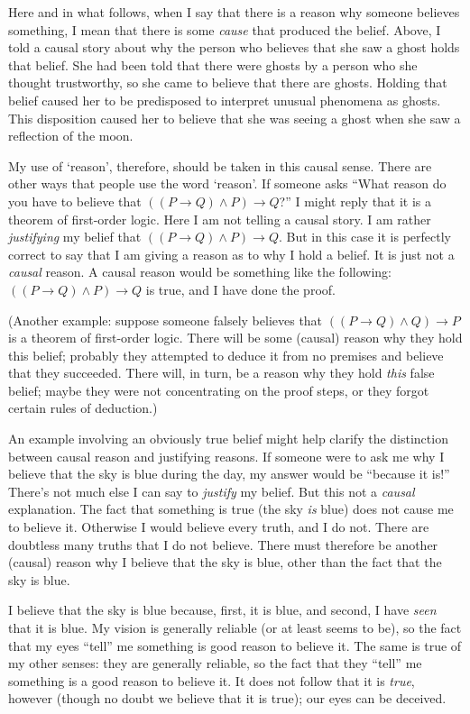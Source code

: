\documentclass[11pt]{article}
\begin{document}
\begin{spacing}{1.5}
Here and in what follows, when I say that there is a reason why
someone believes something, I mean that there is some {\em cause} that
produced the belief.  Above, I told a causal story about why the
person who believes that she saw a ghost holds that belief.  She had
been told that there were ghosts by a person who she thought
trustworthy, so she came to believe that there are ghosts.  Holding
that belief caused her to be predisposed to interpret unusual
phenomena as ghosts.  This disposition caused her to believe that she
was seeing a ghost when she saw a reflection of the moon.

My use of `reason', therefore, should be taken in this causal sense.
There are other ways that people use the word `reason'.  If someone
asks ``What reason do you have to believe that $((P \rightarrow Q )
\wedge P) \rightarrow Q$?''  I might reply that it is a theorem of
first-order logic.  Here I am not telling a causal story.  I am rather
{\em justifying} my belief that $((P \rightarrow Q ) \wedge P)
\rightarrow Q$.  But in this case it is perfectly correct to say that
I am giving a reason as to why I hold a belief.  It is just not a {\em
  causal} reason.  A causal reason would be something like the
following: $((P \rightarrow Q ) \wedge P) \rightarrow Q$ is true, and
I have done the proof.

(Another example: suppose someone falsely believes that $((P
\rightarrow Q ) \wedge Q) \rightarrow P$ is a theorem of first-order
logic.  There will be some (causal) reason why they hold this belief;
probably they attempted to deduce it from no premises and believe that
they succeeded.  There will, in turn, be a reason why they hold {\em
  this} false belief; maybe they were not concentrating on the proof
steps, or they forgot certain rules of deduction.)

An example involving an obviously true belief might help clarify the
distinction between causal reason and justifying reasons.  If someone
were to ask me why I believe that the sky is blue during the day, my
answer would be ``because it is!''  There's not much else I can say to
{\em justify} my belief.  But this not a {\em causal} explanation.
The fact that something is true (the sky {\em is} blue) does not cause
me to believe it.  Otherwise I would believe every truth, and I do
not.  There are doubtless many truths that I do not believe.  There
must therefore be another (causal) reason why I believe that the sky
is blue, other than the fact that the sky is blue.

I believe that the sky is blue because, first, it is blue, and second,
I have {\em seen} that it is blue.  My vision is generally reliable
(or at least seems to be), so the fact that my eyes ``tell'' me
something is good reason to believe it.  The same is true of my other
senses: they are generally reliable, so the fact that they ``tell'' me
something is a good reason to believe it.  It does not follow that it
is {\em true}, however (though no doubt we believe that it is true);
our eyes can be deceived.


\end{spacing}
\end{document}

